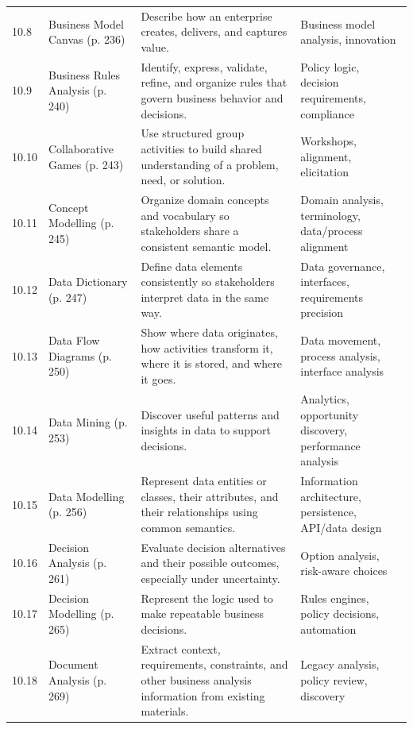 \documentclass[11pt]{article}
\begin{document}
\begin{longtable}{@{}L{0.06\textwidth} L{0.24\textwidth} L{0.43\textwidth} L{0.18\textwidth}@{}}
10.8 & Business Model Canvas \textcolor{BASlate}{\scriptsize (p. 236)} & Describe how an enterprise creates, delivers, and captures value. & Business model analysis, innovation\\
10.9 & Business Rules Analysis \textcolor{BASlate}{\scriptsize (p. 240)} & Identify, express, validate, refine, and organize rules that govern business behavior and decisions. & Policy logic, decision requirements, compliance\\
10.10 & Collaborative Games \textcolor{BASlate}{\scriptsize (p. 243)} & Use structured group activities to build shared understanding of a problem, need, or solution. & Workshops, alignment, elicitation\\
10.11 & Concept Modelling \textcolor{BASlate}{\scriptsize (p. 245)} & Organize domain concepts and vocabulary so stakeholders share a consistent semantic model. & Domain analysis, terminology, data/process alignment\\
10.12 & Data Dictionary \textcolor{BASlate}{\scriptsize (p. 247)} & Define data elements consistently so stakeholders interpret data in the same way. & Data governance, interfaces, requirements precision\\
10.13 & Data Flow Diagrams \textcolor{BASlate}{\scriptsize (p. 250)} & Show where data originates, how activities transform it, where it is stored, and where it goes. & Data movement, process analysis, interface analysis\\
10.14 & Data Mining \textcolor{BASlate}{\scriptsize (p. 253)} & Discover useful patterns and insights in data to support decisions. & Analytics, opportunity discovery, performance analysis\\
10.15 & Data Modelling \textcolor{BASlate}{\scriptsize (p. 256)} & Represent data entities or classes, their attributes, and their relationships using common semantics. & Information architecture, persistence, API/data design\\
10.16 & Decision Analysis \textcolor{BASlate}{\scriptsize (p. 261)} & Evaluate decision alternatives and their possible outcomes, especially under uncertainty. & Option analysis, risk-aware choices\\
10.17 & Decision Modelling \textcolor{BASlate}{\scriptsize (p. 265)} & Represent the logic used to make repeatable business decisions. & Rules engines, policy decisions, automation\\
10.18 & Document Analysis \textcolor{BASlate}{\scriptsize (p. 269)} & Extract context, requirements, constraints, and other business analysis information from existing materials. & Legacy analysis, policy review, discovery\\

\end{longtable}
\end{document}
